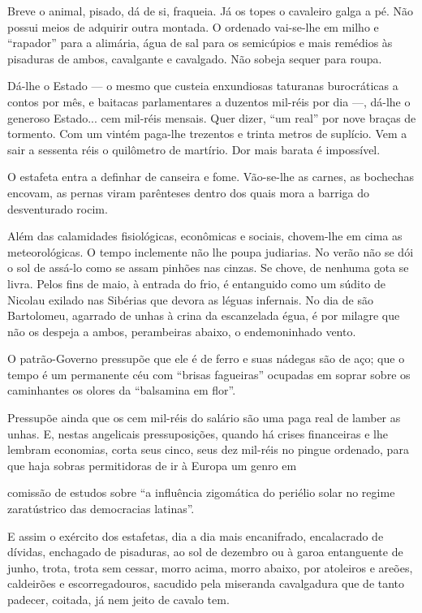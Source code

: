 Breve o animal, pisado, dá de si, fraqueia. Já os topes o cavaleiro
galga a pé. Não possui meios de adquirir outra montada. O ordenado
vai-se-lhe em milho e ``rapador'' para a alimária, água de sal para os
semicúpios e mais remédios às pisaduras de ambos, cavalgante e
cavalgado. Não sobeja sequer para roupa.

Dá-lhe o Estado --- o mesmo que custeia enxundiosas taturanas
burocráticas a contos por mês, e baitacas parlamentares a duzentos
mil-réis por dia ---, dá-lhe o generoso Estado... cem mil-réis mensais.
Quer dizer, ``um real'' por nove braças de tormento. Com um vintém
paga-lhe trezentos e trinta metros de suplício. Vem a sair a sessenta
réis o quilômetro de martírio. Dor mais barata é impossível.

O estafeta entra a definhar de canseira e fome. Vão-se-lhe as carnes, as
bochechas encovam, as pernas viram parênteses dentro dos quais mora a
barriga do desventurado rocim.

Além das calamidades fisiológicas, econômicas e sociais, chovem-lhe em
cima as meteorológicas. O tempo inclemente não lhe poupa judiarias. No
verão não se dói o sol de assá-lo como se assam pinhões nas cinzas. Se
chove, de nenhuma gota se livra. Pelos fins de maio, à entrada do frio,
é entanguido como um súdito de Nicolau exilado nas Sibérias que devora
as léguas infernais. No dia de são Bartolomeu, agarrado de unhas à crina
da escanzelada égua, é por milagre que não os despeja a ambos,
perambeiras abaixo, o endemoninhado vento.

O patrão-Governo pressupõe que ele é de ferro e suas nádegas são de aço;
que o tempo é um permanente céu com ``brisas fagueiras'' ocupadas em
soprar sobre os caminhantes os olores da ``balsamina em flor''.

Pressupõe ainda que os cem mil-réis do salário são uma paga real de
lamber as unhas. E, nestas angelicais pressuposições, quando há crises
financeiras e lhe lembram economias, corta seus cinco, seus dez mil-réis
no pingue ordenado, para que haja sobras permitidoras de ir à Europa um
genro em

comissão de estudos sobre ``a influência zigomática do periélio solar no
regime zaratústrico das democracias latinas''.

E assim o exército dos estafetas, dia a dia mais encanifrado,
encalacrado de dívidas, enchagado de pisaduras, ao sol de dezembro ou à
garoa entanguente de junho, trota, trota sem cessar, morro acima, morro
abaixo, por atoleiros e areões, caldeirões e escorregadouros, sacudido
pela miseranda cavalgadura que de tanto padecer, coitada, já nem jeito
de cavalo tem.

